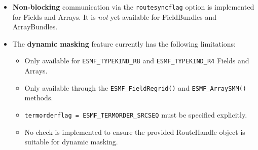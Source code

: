
\begin{itemize}

\item {\bf Non-blocking} communication via the {\tt routesyncflag} option is implemented for Fields and Arrays. It is {\em not} yet available for FieldBundles and ArrayBundles.

\item The {\bf dynamic masking} feature currently has the following limitations:

\begin{itemize}

\item Only available for {\tt ESMF\_TYPEKIND\_R8} and {\tt ESMF\_TYPEKIND\_R4} Fields and Arrays.

\item Only available through the {\tt ESMF\_FieldRegrid()} and {\tt ESMF\_ArraySMM()} methods.

\item {\tt termorderflag = ESMF\_TERMORDER\_SRCSEQ} must be specified explicitly.

\item No check is implemented to ensure the provided RouteHandle object is suitable for dynamic masking.

\end{itemize}


\end{itemize}
